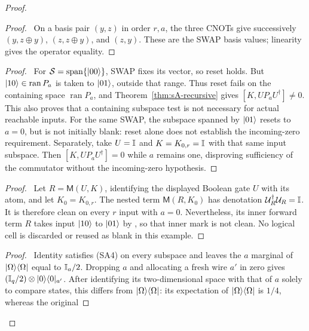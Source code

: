 \begin{proof}
 \begin{proof}\pf\ On a basis pair $(y,z)$ in order $r,a$, the
 three CNOTs give successively $(y,z\oplus y)$,
 $(z,z\oplus y)$, and $(z,y)$. These are the SWAP basis values;
 linearity gives the operator equality.
 \end{proof}
 \begin{proof}\pf\ For $\mathcal S=\operatorname{span}\{\lvert 00\rangle\}$,
 SWAP fixes its vector, so reset holds. But
 $\lvert 10\rangle\in\operatorname{ran}P_a$ is taken to $\lvert 01\rangle$,
 outside that range. Thus reset fails on the containing space
 $\operatorname{ran}P_a$, and Theorem~\ref{thm:sA-recursive}
 gives $[K,UP_aU^\dagger]\ne0$. This also proves that a containing
 subspace test is not necessary for actual reachable inputs.
 For the same SWAP, the subspace spanned by $\lvert 01\rangle$ resets to
 $a=0$, but is not initially blank: reset alone does not establish
 the incoming-zero requirement. Separately, take $U=\mathbb{I}$ and
 $K=K_{0,r}=\mathbb{I}$ with
 that same input subspace. Then $[K,UP_aU^\dagger]=0$ while $a$
 remains one, disproving sufficiency of the commutator without the
 incoming-zero hypothesis.
 \end{proof}
 \begin{proof}\pf\ Let $R=\mathsf M(U,K)$, identifying the displayed
 Boolean gate $U$ with its atom, and let $K_0=K_{0,r}$.
 The nested term $\mathsf M(R,K_0)$ has denotation
 $\mathcal U_R^\dagger\mathcal U_R=\mathbb{I}$. It is therefore clean on
 every $r$ input with $a=0$. Nevertheless, its inner forward term
 $R$ takes input $\lvert 10\rangle$ to $\lvert 01\rangle$ by
 , so that inner mark is not clean.
 No logical cell is discarded or reused as blank in this example.
 \end{proof}
 \begin{proof}\pf\ Identity satisfies (SA4) on every subspace and
 leaves the $a$ marginal of $\lvert \Omega\rangle\langle \Omega\rvert$ equal to $\mathbb{I}_a/2$.
 Dropping $a$ and allocating a fresh wire $a'$ in zero gives
 $(\mathbb{I}_q/2)\otimes\lvert 0\rangle\langle 0\rvert_{a'}$. After identifying its two-dimensional
 space with that of $a$ solely to compare states, this differs from
 $\lvert \Omega\rangle\langle \Omega\rvert$:
 its expectation of $\lvert \Omega\rangle\langle \Omega\rvert$ is $1/4$, whereas the original

\end{proof}
\end{proof}

